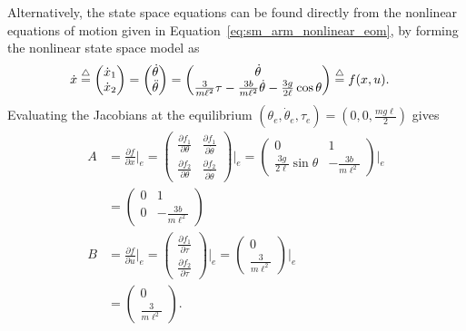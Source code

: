 Alternatively, the state space equations can be found directly from the nonlinear equations of motion given in Equation~\eqref{eq:sm_arm_nonlinear_eom}, by forming the nonlinear state space model as
\begin{align*}
\dot{x} &\stackrel{\triangle}{=} \begin{pmatrix} \dot{x}_1 \\ \dot{x}_2 \end{pmatrix} 
= \begin{pmatrix}\dot{\theta} \\ \ddot{\theta}\end{pmatrix} 
= \begin{pmatrix} \dot{\theta} \\ \frac{3}{m\ell^2}\tau - \frac{3b}{m\ell^2}\dot{\theta} - \frac{3g}{2\ell}\cos\theta  \end{pmatrix} \stackrel{\triangle}{=} f(x,u).
\end{align*}
Evaluating the Jacobians at the equilibrium $(\theta_e, \dot{\theta}_e, \tau_e) = (0, 0, \frac{mg\ell}{2})$ gives
\begin{align*}
A &= \frac{\partial f}{\partial x}\Big|_e = \begin{pmatrix} \frac{\partial f_1}{\partial \theta} & \frac{\partial f_1}{\partial \dot{\theta}} \\ \frac{\partial f_2}{\partial \theta} & \frac{\partial f_2}{\partial \dot{\theta}} \end{pmatrix}\Big|_e 
= \begin{pmatrix} 0 & 1 \\ \frac{3g}{2\ell}\sin\theta & -\frac{3b}{m\ell^2} \end{pmatrix}\Big|_e \\
&= \begin{pmatrix} 0 & 1 \\ 0 & -\frac{3b}{m\ell^2} \end{pmatrix} \\
B &= \frac{\partial f}{\partial u}\Big|_e = \begin{pmatrix} \frac{\partial f_1}{\partial \tau} \\ \frac{\partial f_2}{\partial \tau}  \end{pmatrix}\Big|_e 
= \begin{pmatrix} 0 \\ \frac{3}{m\ell^2} \end{pmatrix}\Big|_e \\
&= \begin{pmatrix} 0 \\ \frac{3}{m\ell^2} \end{pmatrix}.
\end{align*} 
